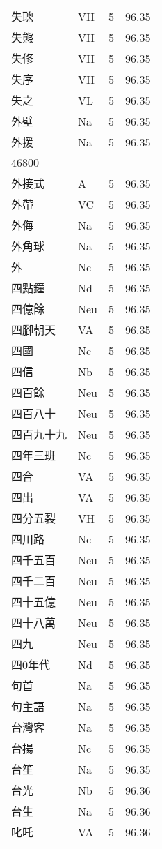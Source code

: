 \documentclass[twocolumn]{book}
\begin{document}
\begin{supertabular}{llrr}
失聰 & VH & 5 &  96.35\\
失態 & VH & 5 &  96.35\\
失修 & VH & 5 &  96.35\\
失序 & VH & 5 &  96.35\\
失之 & VL & 5 &  96.35\\
外壁 & Na & 5 &  96.35\\
外援 & Na & 5 &  96.35\\
46800\\
外接式 & A & 5 &  96.35\\
外帶 & VC & 5 &  96.35\\
外侮 & Na & 5 &  96.35\\
外角球 & Na & 5 &  96.35\\
外 & Nc & 5 &  96.35\\
四點鐘 & Nd & 5 &  96.35\\
四億餘 & Neu & 5 &  96.35\\
四腳朝天 & VA & 5 &  96.35\\
四國 & Nc & 5 &  96.35\\
四信 & Nb & 5 &  96.35\\
四百餘 & Neu & 5 &  96.35\\
四百八十 & Neu & 5 &  96.35\\
四百九十九 & Neu & 5 &  96.35\\
四年三班 & Nc & 5 &  96.35\\
四合 & VA & 5 &  96.35\\
四出 & VA & 5 &  96.35\\
四分五裂 & VH & 5 &  96.35\\
四川路 & Nc & 5 &  96.35\\
四千五百 & Neu & 5 &  96.35\\
四千二百 & Neu & 5 &  96.35\\
四十五億 & Neu & 5 &  96.35\\
四十八萬 & Neu & 5 &  96.35\\
四九 & Neu & 5 &  96.35\\
四0年代 & Nd & 5 &  96.35\\
句首 & Na & 5 &  96.35\\
句主語 & Na & 5 &  96.35\\
台灣客 & Na & 5 &  96.35\\
台揚 & Nc & 5 &  96.35\\
台笙 & Na & 5 &  96.35\\
台光 & Nb & 5 &  96.36\\
台生 & Na & 5 &  96.36\\
叱吒 & VA & 5 &  96.36\\

\end{supertabular}
\end{document}
